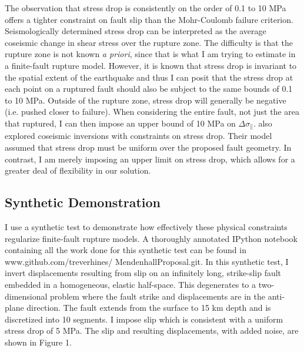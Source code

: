 \documentclass[12pt]{article}
\begin{document}
The observation that stress drop is consistently on the order of 0.1 to 10 MPa offers a tighter constraint on fault slip than the Mohr-Coulomb failure criterion.  Seismologically determined stress drop can be interpreted as the average coseismic change in shear stress over the rupture zone.  The difficulty is that the rupture zone is not known \textit{a priori}, since that is what I am trying to estimate in a finite-fault rupture model.  However, it is known that stress drop is invariant to the spatial extent of the earthquake and thus I can posit that the stress drop at each point on a ruptured fault should also be subject to the same bounds of 0.1 to 10 MPa.  Outside of the rupture zone, stress drop will generally be negative (i.e. pushed closer to failure).  When considering the entire fault, not just the area that ruptured, I can then impose an upper bound of 10 MPa on $\Delta \sigma_\parallel$.  \citet{Sun2011} also explored coseismic inversions with constraints on stress drop.  Their model assumed that stress drop must be uniform over the proposed fault geometry.   In contrast, I am merely imposing an upper limit on stress drop, which allows for a greater deal of flexibility in our solution.        

\subsection*{Synthetic Demonstration}
I use a synthetic test to demonstrate how effectively these physical constraints regularize finite-fault rupture models.  A thoroughly annotated IPython notebook containing all the work done for this synthetic test can be found in www.github.com/treverhines/ MendenhallProposal.git.  In this synthetic test, I invert displacements resulting from slip on an infinitely long, strike-slip fault embedded in a homogeneous, elastic half-space.  This degenerates to a two-dimensional problem where the fault strike and displacements are in the anti-plane direction.  The fault extends from the surface to 15 km depth and is discretized into 10 segments. I impose slip which is consistent with a uniform stress drop of 5 MPa.  The slip and resulting displacements, with added noise, are shown in Figure 1.
\end{document}
